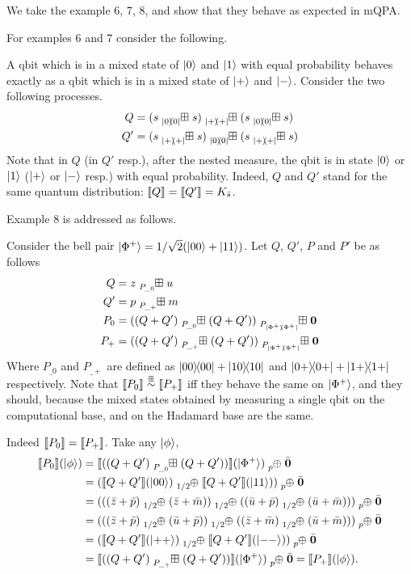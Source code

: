 We take the example 6, 7, 8, and show that they behave as expected in mQPA.

For examples 6 and 7 consider the following.
\begin{example}
	A qbit which is in a mixed state of $\ket{0}$ and $\ket{1}$ with equal probability behaves exactly as a qbit which is in a mixed state of $\ket{+}$ and $\ket{-}$.
	Consider the two following processes.
	\begin{align*}
		Q &= (s \qsum{\ketbra{0}{0}} s) \qsum{\ketbra{+}{+}} (s \qsum{\ketbra{0}{0}} s)\\
		Q' &= (s \qsum{\ketbra{+}{+}} s) \qsum{\ketbra{0}{0}} (s \qsum{\ketbra{+}{+}} s)
	\end{align*}
	Note that in $Q$ (in $Q'$ resp.), after the nested measure, the qbit is in state $\ket{0}$ or $\ket{1}$ ($\ket{+}$ or $\ket{-}$ resp.) with equal probability.
	Indeed, $Q$ and $Q'$ stand for the same quantum distribution: $\llbracket Q\rrbracket = \llbracket Q'\rrbracket = K_{\bar{s}}$.
\end{example}

Example 8 is addressed as follows.
\begin{example}
	Consider the bell pair $\ket{\Phi^+} = 1/\sqrt{2}(\ket{00} + \ket{11})$.
	Let $Q$, $Q'$, $P$ and $P'$ be as follows
	\begin{align*}
		Q &= z \qsum{P_{\_0}} u\\
		Q' &= p \qsum{P_{\_+}} m\\
		P_0 &= ((Q + Q') \qsum{P_{\_0}} (Q + Q')) \qsum{P_{\ketbra{\Phi^+}{\Phi^+}}} \nil\\
		P_+ &= ((Q + Q') \qsum{P_{\_+}} (Q + Q'))  \qsum{P_{\ketbra{\Phi^+}{\Phi^+}}} \nil
	\end{align*}
	Where $P_{\_0}$ and $P_{\_+}$ are defined as $\ket{00}\!\!\bra{00} + \ket{10}\!\!\bra{10}$ and $\ket{0+}\!\!\bra{0+} + \ket{1+}\!\!\bra{1+}$ respectively.
	Note that $\llbracket P_0\rrbracket \stackrel{\scriptscriptstyle \boxplus}{\sim} \llbracket P_+\rrbracket$ iff they behave the same on $\ket{\Phi^+}$, and they should, because the mixed states obtained by measuring a single qbit on the computational base, and on the Hadamard base are the same.

	Indeed $\llbracket P_0\rrbracket = \llbracket P_+\rrbracket$.
	Take any $\ket{\phi}$,
		\begin{align*}
		\sem{P_0}(\ket{\phi}) &= 
		\sem{((Q + Q') \qsum{P_{\_0}} (Q + Q'))}(\ket{\Phi^+}) \psum{p} \bar{\nil}\\
		&= (\sem{Q + Q'}(\ket{00}) \psum{1/2} \sem{Q + Q'}(\ket{11})) \psum{p} \bar{\nil}\\
		&= (((\bar{z} + \bar{p}) \psum{1/2} (\bar{z} + \bar{m})) \psum{1/2} ((\bar{u} + \bar{p}) \psum{1/2} (\bar{u} + \bar{m}))) \psum{p} \bar{\nil}\\
		&= (((\bar{z} + \bar{p}) \psum{1/2} (\bar{u} + \bar{p})) \psum{1/2} ((\bar{z} + \bar{m}) \psum{1/2} (\bar{u} + \bar{m}))) \psum{p} \bar{\nil}\\		
		&= (\sem{Q + Q'}(\ket{++}) \psum{1/2} \sem{Q + Q'}(\ket{--})) \psum{p} \bar{\nil}\\
		&= \sem{((Q + Q') \qsum{P_{\_+}} (Q + Q'))}(\ket{\Phi^+}) \psum{p} \bar{\nil} = \sem{P_+}(\ket{\phi}).
		\end{align*}
\end{example}


